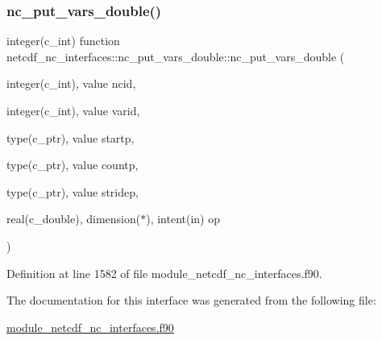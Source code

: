\subsubsection{\texorpdfstring{nc\+\_\+put\+\_\+vars\+\_\+double()}{nc\_put\_vars\_double()}}
{\footnotesize\ttfamily integer(c\+\_\+int) function netcdf\+\_\+nc\+\_\+interfaces\+::nc\+\_\+put\+\_\+vars\+\_\+double\+::nc\+\_\+put\+\_\+vars\+\_\+double (\begin{DoxyParamCaption}\item[{integer(c\+\_\+int), value}]{ncid,  }\item[{integer(c\+\_\+int), value}]{varid,  }\item[{type(c\+\_\+ptr), value}]{startp,  }\item[{type(c\+\_\+ptr), value}]{countp,  }\item[{type(c\+\_\+ptr), value}]{stridep,  }\item[{real(c\+\_\+double), dimension($\ast$), intent(in)}]{op }\end{DoxyParamCaption})}



Definition at line 1582 of file module\+\_\+netcdf\+\_\+nc\+\_\+interfaces.\+f90.



The documentation for this interface was generated from the following file\+:\begin{DoxyCompactItemize}
\item 
\hyperlink{module__netcdf__nc__interfaces_8f90}{module\+\_\+netcdf\+\_\+nc\+\_\+interfaces.\+f90}\end{DoxyCompactItemize}
